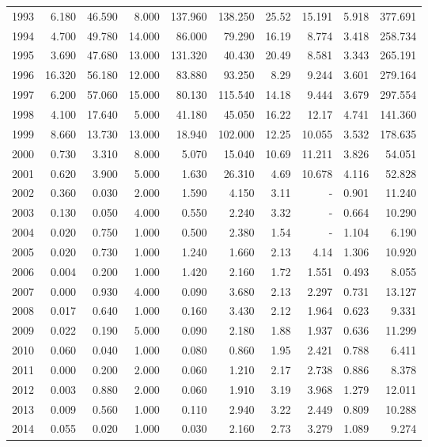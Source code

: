 \documentclass[
]{scrartcl}
\begin{document}
\begin{longtable}{rrrrrrrrrr}
1993 & 6.180 & 46.590 & 8.000 & 137.960 & 138.250 & 25.52 & 15.191 & 5.918 & 377.691 \\ 
1994 & 4.700 & 49.780 & 14.000 & 86.000 & 79.290 & 16.19 & 8.774 & 3.418 & 258.734 \\ 
1995 & 3.690 & 47.680 & 13.000 & 131.320 & 40.430 & 20.49 & 8.581 & 3.343 & 265.191 \\ 
1996 & 16.320 & 56.180 & 12.000 & 83.880 & 93.250 & 8.29 & 9.244 & 3.601 & 279.164 \\ 
1997 & 6.200 & 57.060 & 15.000 & 80.130 & 115.540 & 14.18 & 9.444 & 3.679 & 297.554 \\ 
1998 & 4.100 & 17.640 & 5.000 & 41.180 & 45.050 & 16.22 & 12.17 & 4.741 & 141.360 \\ 
1999 & 8.660 & 13.730 & 13.000 & 18.940 & 102.000 & 12.25 & 10.055 & 3.532 & 178.635 \\ 
2000 & 0.730 & 3.310 & 8.000 & 5.070 & 15.040 & 10.69 & 11.211 & 3.826 & 54.051 \\ 
2001 & 0.620 & 3.900 & 5.000 & 1.630 & 26.310 & 4.69 & 10.678 & 4.116 & 52.828 \\ 
2002 & 0.360 & 0.030 & 2.000 & 1.590 & 4.150 & 3.11 &  -  & 0.901 & 11.240 \\ 
2003 & 0.130 & 0.050 & 4.000 & 0.550 & 2.240 & 3.32 &  -  & 0.664 & 10.290 \\ 
2004 & 0.020 & 0.750 & 1.000 & 0.500 & 2.380 & 1.54 &  -  & 1.104 & 6.190 \\ 
2005 & 0.020 & 0.730 & 1.000 & 1.240 & 1.660 & 2.13 & 4.14 & 1.306 & 10.920 \\ 
2006 & 0.004 & 0.200 & 1.000 & 1.420 & 2.160 & 1.72 & 1.551 & 0.493 & 8.055 \\ 
2007 & 0.000 & 0.930 & 4.000 & 0.090 & 3.680 & 2.13 & 2.297 & 0.731 & 13.127 \\ 
2008 & 0.017 & 0.640 & 1.000 & 0.160 & 3.430 & 2.12 & 1.964 & 0.623 & 9.331 \\ 
2009 & 0.022 & 0.190 & 5.000 & 0.090 & 2.180 & 1.88 & 1.937 & 0.636 & 11.299 \\ 
2010 & 0.060 & 0.040 & 1.000 & 0.080 & 0.860 & 1.95 & 2.421 & 0.788 & 6.411 \\ 
2011 & 0.000 & 0.200 & 2.000 & 0.060 & 1.210 & 2.17 & 2.738 & 0.886 & 8.378 \\ 
2012 & 0.003 & 0.880 & 2.000 & 0.060 & 1.910 & 3.19 & 3.968 & 1.279 & 12.011 \\ 
2013 & 0.009 & 0.560 & 1.000 & 0.110 & 2.940 & 3.22 & 2.449 & 0.809 & 10.288 \\ 
2014 & 0.055 & 0.020 & 1.000 & 0.030 & 2.160 & 2.73 & 3.279 & 1.089 & 9.274 \\ 

\end{longtable}
\end{document}
